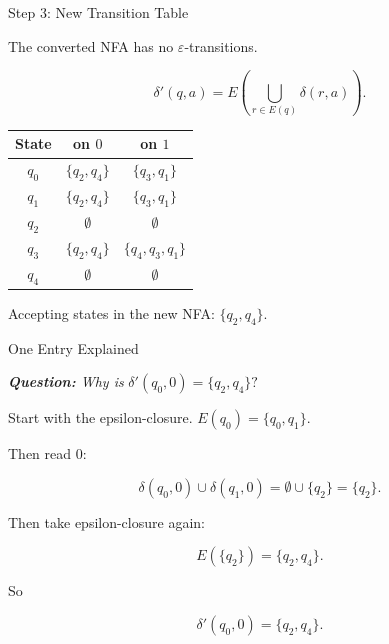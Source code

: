 \documentclass[10pt,aspectratio=169]{beamer}
\newcommand{\eps}{\varepsilon}
\begin{document}
\begin{frame}{Step 3: New Transition Table}

The converted NFA has no \(\eps\)-transitions.

\[
\delta'(q,a)
=
E\left(\bigcup_{r\in E(q)}\delta(r,a)\right).
\]

\vspace{0.5em}

\begin{center}
\begin{tabular}{c|cc}
\toprule
\textbf{State} & \textbf{on \(0\)} & \textbf{on \(1\)}\\
\midrule
$q_0$ & $\{q_2,q_4\}$ & $\{q_3,q_1\}$\\
$q_1$ & $\{q_2,q_4\}$ & $\{q_3,q_1\}$\\
$q_2$ & $\emptyset$ & $\emptyset$\\
$q_3$ & $\{q_2,q_4\}$ & $\{q_4,q_3,q_1\}$\\
$q_4$ & $\emptyset$ & $\emptyset$\\
\bottomrule
\end{tabular}
\end{center}

\vspace{0.4em}

Accepting states in the new NFA: \(\{q_2,q_4\}\).

\end{frame}

\begin{frame}{One Entry Explained}

\textit{\textbf{Question:} Why is} \(
\delta'(q_0,0)=\{q_2,q_4\}?
\)

\vspace{0.7em}

Start with the epsilon-closure. \(
E(q_0)=\{q_0,q_1\}.
\)

Then read \(0\):

\[
\delta(q_0,0)\cup\delta(q_1,0)
=
\emptyset\cup\{q_2\}
=
\{q_2\}.
\]

Then take epsilon-closure again:

\[
E(\{q_2\})=\{q_2,q_4\}.
\]

So

\[
\delta'(q_0,0)=\{q_2,q_4\}.
\]

\end{frame}
\end{document}
